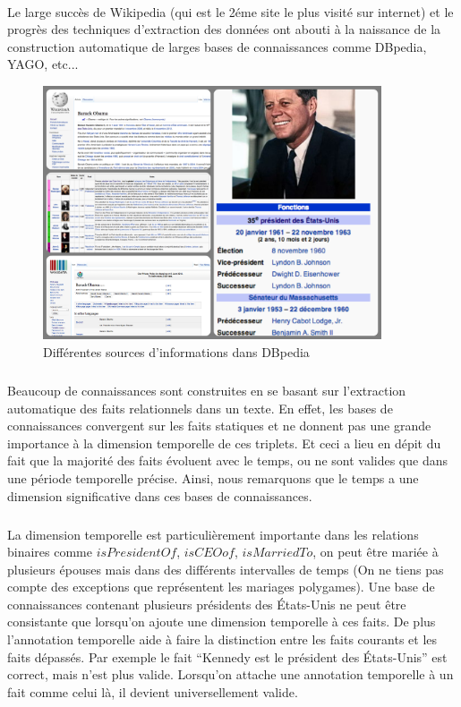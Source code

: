 \paragraph{}
Le large succès de Wikipedia (qui est le 2éme site le plus visité sur internet) et le progrès des techniques d’extraction des données ont abouti à la naissance de la construction automatique  de larges bases de connaissances comme DBpedia, YAGO, etc...
\begin{figure}[H]
\centering
\includegraphics[width=10cm]{Sources.png}
\caption{Différentes sources d'informations dans DBpedia}
\end{figure}
\subparagraph{}
Beaucoup de connaissances sont construites en se basant sur l’extraction automatique des faits relationnels dans un texte.
En effet, les bases de connaissances convergent sur les faits statiques et ne donnent pas une grande importance à la dimension temporelle de ces triplets.
Et ceci a lieu en dépit du fait que la majorité des faits évoluent avec le temps, ou ne sont valides que dans une période temporelle précise. Ainsi, nous remarquons que le temps a une dimension significative dans ces bases de connaissances.
\subparagraph{}
La dimension temporelle est particulièrement importante dans les relations binaires comme $isPresidentOf$, $isCEOof$, $isMarriedTo$, on peut être mariée à plusieurs épouses mais dans des différents intervalles de temps (On ne tiens pas compte des exceptions que représentent les mariages polygames).
Une base de connaissances contenant plusieurs présidents des États-Unis ne peut être consistante que lorsqu’on ajoute une dimension temporelle à ces faits. De plus l’annotation temporelle aide à faire la distinction entre les faits courants et les faits dépassés.
Par exemple le fait ``Kennedy est le président des États-Unis'' est correct, mais n'est plus valide.
Lorsqu’on attache une annotation temporelle à un fait comme celui là, il devient universellement valide.

